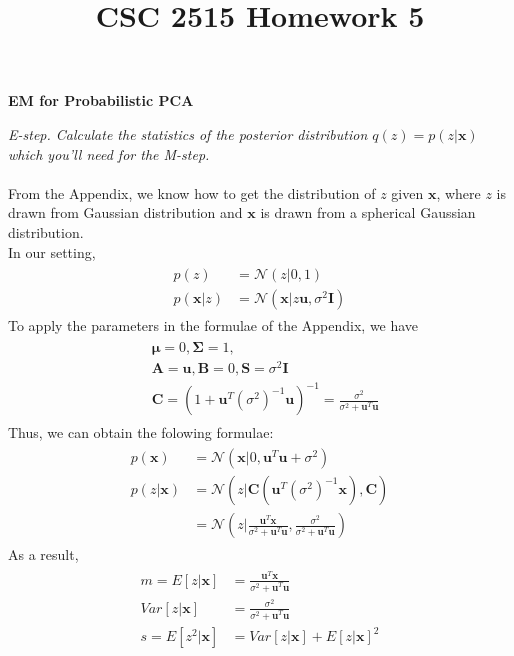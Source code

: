 \documentclass{myhw}
\title{CSC 2515 Homework 5}
\begin{document}
\begin{homeworkProblem}
\textbf{EM for Probabilistic PCA} 
\begin{homeworkSection}	
\emph{E-step. Calculate the statistics of the posterior
distribution $q(z)=p(z|\textbf{x})$ which you’ll need for the M-step.} \\
\\
From the Appendix, we know how to get the distribution of $z$ given $\textbf{x}$, where $z$ is drawn from Gaussian distribution and $\textbf{x}$ is drawn from a spherical Gaussian distribution. \\
In our setting, 
\begin{gather*}
\begin{aligned}
p(z) &= \mathcal{N}(z|0,1) \\
p(\textbf{x}|z) &= \mathcal{N}(\textbf{x}|z\textbf{u},\sigma^2\textbf{I})
\end{aligned}
\end{gather*}
To apply the parameters in the formulae of the Appendix, we have
\begin{gather*}
\begin{aligned}
& \bm{\mu} = 0, \bm{\Sigma} = 1, \\
& \bm{A} = \bm{u}, \bm{B} = 0, \bm{S} = \sigma^2\bm{I} \\
& \bm{C} = (1+\bm{u}^T(\sigma^2)^{-1}\bm{u})^{-1} 
= \frac{\sigma^2}{\sigma^2 + \bm{u}^T\bm{u}} 
\end{aligned}
\end{gather*}
Thus, we can obtain the folowing formulae:
\begin{gather*}
\begin{aligned}
p(\bm{x}) &= \mathcal{N}(\bm{x}|0, \bm{u}^T \bm{u} + \sigma^2) \\
p(z|\bm{x}) &= \mathcal{N}(z|\bm{C}(\bm{u}^T(\sigma^2)^{-1}\bm{x}),\bm{C}) \\
&= \mathcal{N}(z|\frac{\bm{u}^T\bm{x}}{\sigma^2+\bm{u}^T\bm{u}},
\frac{\sigma^2}{\sigma^2+\bm{u}^T\bm{u}})
\end{aligned}
\end{gather*}
As a result, 
\begin{gather*}
\begin{aligned}
m=E[z|\bm{x}] &= \frac{\bm{u}^T\bm{x}}{\sigma^2+\bm{u}^T\bm{u}} \\
Var[z|\bm{x}] &= \frac{\sigma^2}{\sigma^2+\bm{u}^T\bm{u}} \\
s=E[z^2|\bm{x}] &= Var[z|\bm{x}] + E[z|\bm{x}]^2 \\

\end{aligned}
\end{gather*}
\end{homeworkSection}
\end{homeworkProblem}
\end{document}
